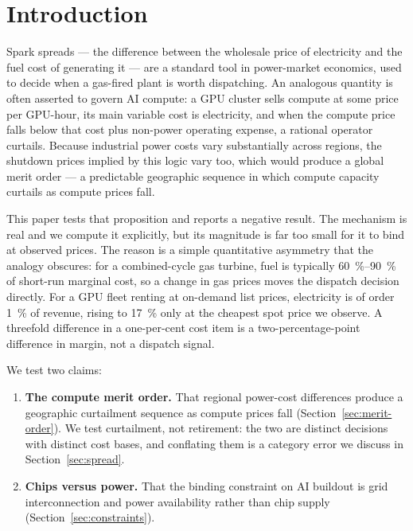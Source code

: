 \documentclass[11pt]{article}
\begin{document}
\tableofcontents

\section{Introduction}
\label{sec:intro}

Spark spreads --- the difference between the wholesale price of
electricity and the fuel cost of generating it --- are a standard tool in
power-market economics, used to decide when a gas-fired plant is worth
dispatching. An analogous quantity is often asserted to govern AI compute:
a GPU cluster sells compute at some price per GPU-hour, its main variable
cost is electricity, and when the compute price falls below that cost plus
non-power operating expense, a rational operator curtails. Because
industrial power costs vary substantially across regions, the shutdown
prices implied by this logic vary too, which would produce a global merit
order --- a predictable geographic sequence in which compute capacity
curtails as compute prices fall.

This paper tests that proposition and reports a negative result. The
mechanism is real and we compute it explicitly, but its magnitude is far
too small for it to bind at observed prices. The reason is a simple
quantitative asymmetry that the analogy obscures: for a combined-cycle gas
turbine, fuel is typically \SIrange{60}{90}{\percent} of short-run marginal
cost, so a change in gas prices moves the dispatch decision directly. For a
GPU fleet renting at on-demand list prices, electricity is of order
\SI{1}{\percent} of revenue, rising to \SI{17}{\percent} only at the
cheapest spot price we observe. A threefold difference in a one-per-cent
cost item is a two-percentage-point difference in margin, not a dispatch
signal.

We test two claims:
\begin{enumerate}
  \item \textbf{The compute merit order.} That regional power-cost
    differences produce a geographic curtailment sequence as compute
    prices fall (Section~\ref{sec:merit-order}). We test curtailment, not
    retirement: the two are distinct decisions with distinct cost bases,
    and conflating them is a category error we discuss in
    Section~\ref{sec:spread}.
  \item \textbf{Chips versus power.} That the binding constraint on AI
    buildout is grid interconnection and power availability rather than
    chip supply (Section~\ref{sec:constraints}).
\end{enumerate}
\end{document}

